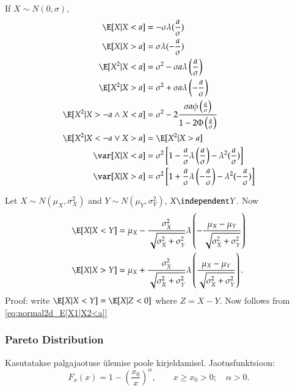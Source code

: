 \documentclass[a4paper]{article}
\numberwithin{equation}{subsection}
\begin{document}
If $X \sim N(0, \sigma)$, 
\begin{align}
\E[X|X<a]
 &=
 -\sigma \lambda(\frac{a}{\sigma})
\\
\E[X|X>a] 
&=
\sigma \lambda(-\frac{a}{\sigma})
\\
\E[X^2|X < a]
&=
\sigma^2 - \sigma a \lambda \left(\frac{a}{\sigma} \right)
\\
\E[X^2|X > a]
&=
\sigma^2 + \sigma a \lambda \left(-\frac{a}{\sigma} \right)
\\
\E[X^2|X > -a \land X < a]
&=
\sigma^2 - 
2 \frac{\sigma a \phi\left(\frac{a}{\sigma} \right)}
{1 - 2 \Phi\left(\frac{a}{\sigma} \right)}
\\
\E[X^2|X < -a \lor X > a] 
&=
\E[X^2|X > a]
\\
\var[X|X <a] 
&= 
\sigma^2 \left[1 - 
  \frac{a}{\sigma} \lambda\left(\frac{a}{\sigma}\right) -
  \lambda^2(\frac{a}{\sigma}) \right]
\\
\var[X|X > a] 
&=
\sigma^2 \left[1 + 
  \frac{a}{\sigma} \lambda \left(-\frac{a}{\sigma} \right) - 
  \lambda^2(-\frac{a}{\sigma}) \right] \\
\end{align}

Let $X \sim N(\mu_{X}, \sigma_{X}^{2})$ and $Y \sim N(\mu_{Y},
\sigma_{Y}^{2})$, $X \independent Y$.  Now
\begin{align}
  \E[X|X < Y] 
  &=
  \mu_{X}
  - \frac{\sigma_{X}^{2}}{\sqrt{\sigma_{X}^{2} + \sigma_{Y}^{2}}}
  \lambda\left( -\frac{\mu_{X} - \mu_{Y}}
    {\sqrt{\sigma_{X}^{2} + \sigma_{Y}^{2}}}
    \right)
  \\
  \E[X|X > Y] 
  &=
  \mu_{X}
  + \frac{\sigma_{X}^{2}}{\sqrt{\sigma_{X}^{2} + \sigma_{Y}^{2}}}
  \lambda\left( \frac{\mu_{X} - \mu_{Y}}
    {\sqrt{\sigma_{X}^{2} + \sigma_{Y}^{2}}}
    \right).
\end{align}
Proof: write $\E[X|X < Y] = \E[X|Z < 0]$ where $Z = X-Y$.  Now
follows from \eqref{eq:normal2d_E[X1|X2<a]}

\subsubsection{Pareto Distribution}
Kasutatakse palgajaotuse ülemise poole kirjeldamisel.
Jaotusfunktsioon: 
\begin{equation}
F_x (x) = 1 - \left( \frac{x_0}{x} \right)^\alpha, \qquad 
  x \ge x_0 > 0; \quad \alpha > 0.
\end{equation}
\end{document}

